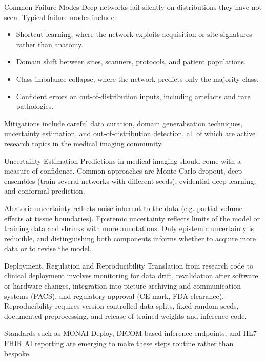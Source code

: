\begin{frame}{Common Failure Modes}
    Deep networks fail silently on distributions they have not seen. Typical failure modes include:
    \begin{itemize}
        \item Shortcut learning, where the network exploits acquisition or site signatures rather than anatomy.
        \item Domain shift between sites, scanners, protocols, and patient populations.
        \item Class imbalance collapse, where the network predicts only the majority class.
        \item Confident errors on out-of-distribution inputs, including artefacts and rare pathologies.
    \end{itemize}
    Mitigations include careful data curation, domain generalisation techniques, uncertainty estimation, and out-of-distribution detection, all of which are active research topics in the medical imaging community.
\end{frame}

\begin{frame}{Uncertainty Estimation}
    Predictions in medical imaging should come with a measure of confidence. Common approaches are Monte Carlo dropout, deep ensembles (train several networks with different seeds), evidential deep learning, and conformal prediction.

    Aleatoric uncertainty reflects noise inherent to the data (e.g. partial volume effects at tissue boundaries). Epistemic uncertainty reflects limits of the model or training data and shrinks with more annotations. Only epistemic uncertainty is reducible, and distinguishing both components informs whether to acquire more data or to revise the model.
\end{frame}

\begin{frame}{Deployment, Regulation and Reproducibility}
    Translation from research code to clinical deployment involves monitoring for data drift, revalidation after software or hardware changes, integration into picture archiving and communication systems (PACS), and regulatory approval (CE mark, FDA clearance). Reproducibility requires version-controlled data splits, fixed random seeds, documented preprocessing, and release of trained weights and inference code.

    Standards such as MONAI Deploy, DICOM-based inference endpoints, and HL7 FHIR AI reporting are emerging to make these steps routine rather than bespoke.
\end{frame}


